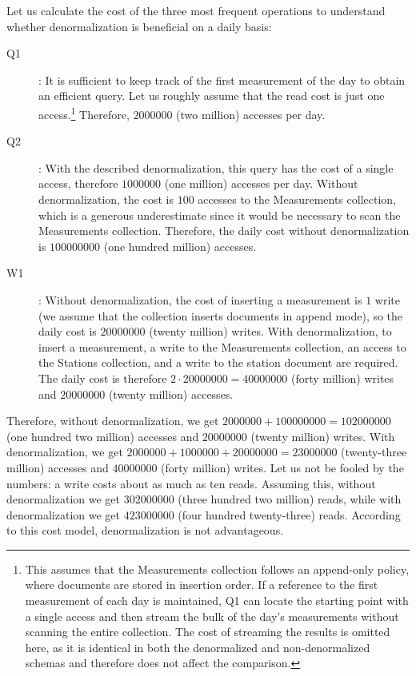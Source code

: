 \begin{example}{}
    Let us calculate the cost of the three most frequent operations to understand whether denormalization is beneficial on a daily basis:
    \begin{description}
        \item[Q1]: It is sufficient to keep track of the first measurement of the day to obtain an efficient query. Let us roughly assume that the read cost is just one access.\footnote{This assumes that the Measurements collection follows an append-only policy, where documents are stored in insertion order. If a reference to the first measurement of each day is maintained, Q1 can locate the starting point with a single access and then stream the bulk of the day's measurements without scanning the entire collection. The cost of streaming the results is omitted here, as it is identical in both the denormalized and non-denormalized schemas and therefore does not affect the comparison.} 
            Therefore, \(2000000\) (two million) accesses per day.
        \item[Q2]: With the described denormalization, this query has the cost of a single access, therefore \(1000000\) (one million) accesses per day. Without denormalization, the cost is \(100\) accesses to the Measurements collection, which is a generous underestimate since it would be necessary to scan the Measurements collection. Therefore, the daily cost without denormalization is \(100000000\) (one hundred million) accesses.
        \item[W1]: Without denormalization, the cost of inserting a measurement is \(1\) write (we assume that the collection inserts documents in append mode), so the daily cost is \(20000000\) (twenty million) writes. With denormalization, to insert a measurement, a write to the Measurements collection, an access to the Stations collection, and a write to the station document are required. The daily cost is therefore \(2\cdot 20000000 = 40000000\) (forty million) writes and \(20000000\) (twenty million) accesses.
    \end{description}
    Therefore, without denormalization, we get \(2000000 + 100000000 = 102000000\) (one hundred two million) accesses and \(20000000\) (twenty million) writes. With denormalization, we get \(2000000 + 1000000 + 20000000 = 23000000\) (twenty-three million) accesses and \(40000000\) (forty million) writes.
    Let us not be fooled by the numbers: a write costs about as much as ten reads. Assuming this, without denormalization we get \(302000000\) (three hundred two million) reads, while with denormalization we get \(423000000\) (four hundred twenty-three) reads.
    According to this cost model, denormalization is not advantageous.
\end{example}


